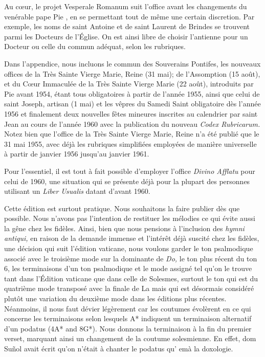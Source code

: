 \begin{frpars}

Au cœur, le projet Vesperale Romanum suit l'office avant les changements du venérable pape Pie , en se permettant tout de même une certain discretion. Par exemple, les noms de saint Antoine et de saint Laurent de Brindes se trouvent parmi les Docteurs de l'Église. On est ainsi libre de choisir l'antienne pour un Docteur ou celle du commun adéquat, selon les rubriques.

Dans l'appendice, nous incluons le commun des Souverains Pontifes, les nouveaux offices de la Très Sainte Vierge Marie, Reine (31 mai); de l'Assomption (15 août), et du Cœur Immaculée de la Très Sainte Vierge Marie (22 août), introduits par Pie  avant 1954, étant tous obligatoires à partir de l'année 1955, ainsi que celui de saint Joseph, artisan (1 mai) et les vêpres du Samedi Saint obligatoire dès l'année 1956 et finalement deux nouvelles fêtes mineures inscrites au calendrier par saint Jean  au cours de l'année 1960 avec la publication du nouveau \textit{Codex Rubricarum.} Notez bien que l'office de la Très Sainte Vierge Marie, Reine n'a été publié que le 31 mai 1955, avec déjà les rubriques simplifiées employées de manière universelle à partir de janvier 1956 jusqu'au janvier 1961.

Pour l'essentiel, il est tout à fait possible d'employer l'office \textit{Divino Afflatu} pour celui de 1960, une situation qui se présente déjà pour la plupart des personnes utilisant un \textit{Liber Usualis} datant d'avant 1960.

Cette édition est surtout pratique. Nous souhaitons la faire publier dès que possible. Nous n'avons pas l'intention de restituer les mélodies ce qui évite aussi la gêne chez les fidèles. Ainsi, bien que nous pensions à l'inclusion des \textit{hymni antiqui,} en raison de la demande immense et l'intérêt déjà suscité chez les fidèles, une décision qui suit l'édition vaticane, nous voulons garder le ton psalmodique associé avec le troisième mode sur la dominante de \textit{Do,} le ton plus récent du ton 6, les terminaisons d'un ton psalmodique et le mode assigné tel qu'on le trouve tant dans l'Édition vaticane que dans celle de Solesmes, surtout le ton qui est du quatrième mode transposé avec la finale de La mais qui est désormais considéré plutôt une variation du deuxième mode dans les éditions plus récentes. Néanmoins, il nous faut dévier légèrement car les coutumes évolèrent en ce qui concerne les terminaisons selon lesquels A* indiquent un terminaison alternatif d'un podatus  (4A* and 8G*). Nous donnons la terminaison à la fin du premier verset, marquant ainsi un changement de la coutume solesmienne. En effet, dom Suñol avait écrit qu'on n'était à chanter le podatus qu' emà la doxologie.


\end{frpars}
